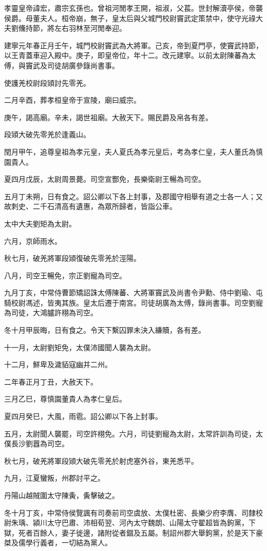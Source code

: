 
\begin{pinyinscope}
孝靈皇帝諱宏，肅宗玄孫也。曾祖河閒孝王開，祖淑，父萇。世封解瀆亭侯，帝襲侯爵。母董夫人。桓帝崩，無子，皇太后與父城門校尉竇武定策禁中，使守光祿大夫劉儵持節，將左右羽林至河閒奉迎。

建寧元年春正月壬午，城門校尉竇武為大將軍。己亥，帝到夏門亭，使竇武持節，以王青蓋車迎入殿中。庚子，即皇帝位，年十二。改元建寧。以前太尉陳蕃為太傅，與竇武及司徒胡廣參錄尚書事。

使護羌校尉段熲討先零羌。

二月辛酉，葬孝桓皇帝于宣陵，廟曰威宗。

庚午，謁高廟。辛未，謁世祖廟。大赦天下。賜民爵及帛各有差。

段熲大破先零羌於逢義山。

閏月甲午，追尊皇祖為孝元皇，夫人夏氏為孝元皇后，考為孝仁皇，夫人董氏為慎園貴人。

夏四月戊辰，太尉周景薨。司空宣酆免，長樂衛尉王暢為司空。

五月丁未朔，日有食之。詔公卿以下各上封事，及郡國守相舉有道之士各一人；又故刺史、二千石清高有遺惠，為眾所歸者，皆詣公車。

太中大夫劉矩為太尉。

六月，京師雨水。

秋七月，破羌將軍段熲復破先零羌於涇陽。

八月，司空王暢免，宗正劉寵為司空。

九月丁亥，中常侍曹節矯詔誅太傅陳蕃、大將軍竇武及尚書令尹勳、侍中劉瑜、屯騎校尉馮述，皆夷其族。皇太后遷于南宮。司徒胡廣為太傅，錄尚書事。司空劉寵為司徒，大鴻臚許栩為司空。

冬十月甲辰晦，日有食之。令天下繫囚罪未決入縑贖，各有差。

十一月，太尉劉矩免，太僕沛國聞人襲為太尉。

十二月，鮮卑及濊貊寇幽并二州。

二年春正月丁丑，大赦天下。

三月乙巳，尊慎園董貴人為孝仁皇后。

夏四月癸巳，大風，雨雹。詔公卿以下各上封事。

五月，太尉聞人襲罷，司空許栩免。六月，司徒劉寵為太尉，太常許訓為司徒，太僕長沙劉囂為司空。

秋七月，破羌將軍段熲大破先零羌於射虎塞外谷，東羌悉平。

九月，江夏蠻叛，州郡討平之。

丹陽山越賊圍太守陳夤，夤擊破之。

冬十月丁亥，中常侍侯覽諷有司奏前司空虞放、太僕杜密、長樂少府李膺、司隸校尉朱瑀、潁川太守巴肅、沛相荀翌、河內太守魏朗、山陽太守翟超皆為鉤黨，下獄，死者百餘人，妻子徙邊，諸附從者錮及五屬。制詔州郡大舉鉤黨，於是天下豪桀及儒學行義者，一切結為黨人。


\end{pinyinscope}
